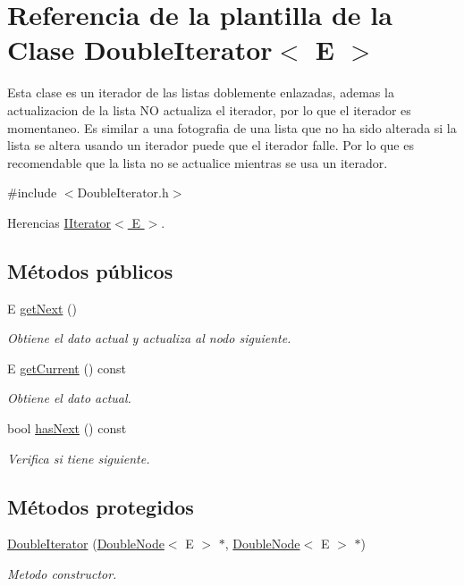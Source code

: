 \hypertarget{classDoubleIterator}{\section{Referencia de la plantilla de la Clase Double\-Iterator$<$ E $>$}
\label{classDoubleIterator}
}


Esta clase es un iterador de las listas doblemente enlazadas, ademas la actualizacion de la lista N\-O actualiza el iterador, por lo que el iterador es momentaneo. Es similar a una fotografia de una lista que no ha sido alterada si la lista se altera usando un iterador puede que el iterador falle. Por lo que es recomendable que la lista no se actualice mientras se usa un iterador.  




{\ttfamily \#include $<$Double\-Iterator.\-h$>$}



Herencias \hyperlink{classIIterator}{I\-Iterator$<$ E $>$}.

\subsection*{Métodos públicos}
\begin{DoxyCompactItemize}
\item 
E \hyperlink{classDoubleIterator_aaaa1b361a61339bfee3bf86f3f67b198}{get\-Next} ()
\begin{DoxyCompactList}\small\item\em Obtiene el dato actual y actualiza al nodo siguiente. \end{DoxyCompactList}\item 
E \hyperlink{classDoubleIterator_a756bb08f5352e270e08b72339c32e2be}{get\-Current} () const 
\begin{DoxyCompactList}\small\item\em Obtiene el dato actual. \end{DoxyCompactList}\item 
bool \hyperlink{classDoubleIterator_adb5ef4c66649e0a4ce18e38cd85904ed}{has\-Next} () const 
\begin{DoxyCompactList}\small\item\em Verifica si tiene siguiente. \end{DoxyCompactList}\end{DoxyCompactItemize}
\subsection*{Métodos protegidos}
\begin{DoxyCompactItemize}
\item 
\hyperlink{classDoubleIterator_a5b45a91dc363462fddcb4965e226e2fc}{Double\-Iterator} (\hyperlink{classDoubleNode}{Double\-Node}$<$ E $>$ $\ast$, \hyperlink{classDoubleNode}{Double\-Node}$<$ E $>$ $\ast$)
\begin{DoxyCompactList}\small\item\em Metodo constructor. \end{DoxyCompactList}\end{DoxyCompactItemize}
